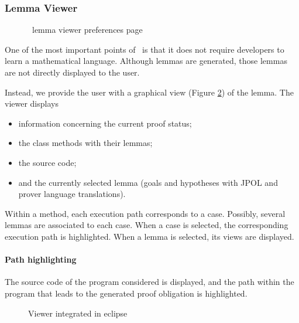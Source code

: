 \subsubsection{Lemma Viewer}
\begin{figure}[p]
 \caption{\sc \JACK\ lemma viewer preferences page}
 \label{JACKlemviewprefpage}
\end{figure}
\label{Viewer}
One of the most important points of \JACK\ is that it does not require
developers to learn a mathematical language.  Although lemmas are
generated, those lemmas are not directly displayed to the user.

Instead, we provide the user with a graphical view (Figure \ref{Viewer image}) of the lemma.
 The viewer displays
 \begin{itemize}
  \item information concerning the current proof status;
  \item the class methods with their lemmas;
  \item the source code;
  \item and the currently selected lemma (goals and hypotheses with JPOL and prover language translations).
\end{itemize}
 Within a method, each execution path corresponds to a case.
 Possibly, several lemmas are associated to each case.
 When a case is selected, the corresponding execution path is highlighted.
 When a lemma is selected, its views are displayed.
\paragraph{Path highlighting}
The source code of the program considered is displayed, and the
path within the program that leads to the generated proof obligation
is highlighted.

\begin{figure}[p]
 \caption{\sc Viewer integrated in eclipse}
 \label{Viewer image}
\end{figure}

